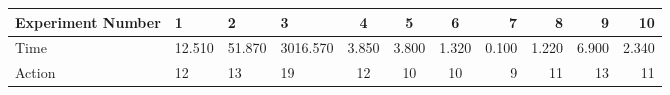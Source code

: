 \documentclass[8pt]{article}
\begin{document}
\begin{landscape}
\begin{tabular}{ | l | l | l | l | c | c | c | r | r | r | r | }
 \hline 
Experiment Number & 1 & 2 & 3 & 4 & 5 & 6 & 7 & 8 & 9 & 10\\ \hline
Time & 12.510 & 51.870 & 3016.570 & 3.850 & 3.800 & 1.320 & 0.100 & 1.220 & 6.900 & 2.340\\ \hline
Action & 12 & 13 & 19 & 12 & 10 & 10 & 9 & 11 & 13 & 11\\ \hline\end{tabular}
\end{landscape}
\end{document}
